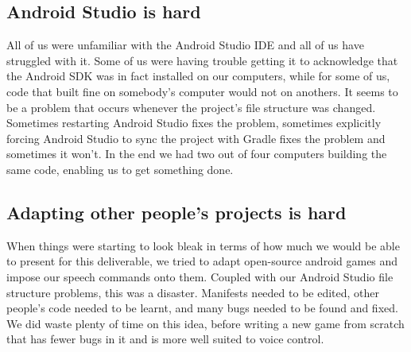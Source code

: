 \documentclass[11pt, oneside]{article}
\begin{document}
\subsection*{Android Studio is hard}

All of us were unfamiliar with the Android Studio IDE and all of us
have struggled with it. Some of us were having trouble getting it to
acknowledge that the Android SDK was in fact installed on our
computers, while for some of us, code that built fine on somebody's
computer would not on anothers. It seems to be a problem that occurs
whenever the project's file structure was changed. Sometimes
restarting Android Studio fixes the problem, sometimes explicitly
forcing Android Studio to sync the project with Gradle fixes the
problem and sometimes it won't. In the end we had two out of four
computers building the same code, enabling us to get something done.

\subsection*{Adapting other people's projects is hard}

When things were starting to look bleak in terms of how much we would
be able to present for this deliverable, we tried to adapt open-source
android games and impose our speech commands onto them. Coupled with
our Android Studio file structure problems, this was a disaster.
Manifests needed to be edited, other people’s code needed to be
learnt, and many bugs needed to be found and fixed.  We did waste
plenty of time on this idea, before writing a new game from scratch
that has fewer bugs in it and is more well suited to voice control.
\end{document}
